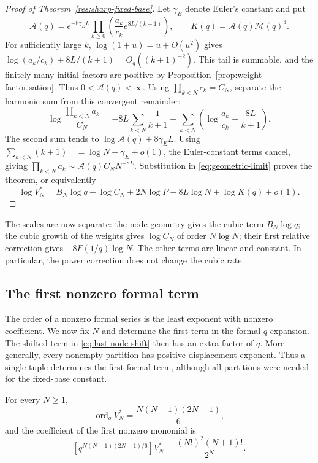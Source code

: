 \documentclass[11pt]{article}
\begin{document}
\begin{proof}[Proof of Theorem~\ref{res:sharp-fixed-base}]
Let $\gamma_{\!E}$ denote Euler's constant and put
\begin{equation}\label{eq:fixed-constant}
 \mathcal A(q)=e^{-8\gamma_{\!E}L}
 \prod_{k\ge0}\left(\frac{a_k}{c_k}e^{8L/(k+1)}\right),
 \qquad K(q)=\mathcal A(q)\mathcal M(q)^3.
\end{equation}
For sufficiently large $k$, $\log(1+u)=u+O(u^2)$ gives
$\log(a_k/c_k)+8L/(k+1)=O_q((k+1)^{-2})$.
This tail is summable, and the finitely many initial factors are
positive by Proposition~\ref{prop:weight-factorisation}. Thus
$0<\mathcal A(q)<\infty$.
Using $\prod_{k<N}c_k=C_N$, separate the harmonic sum from this
convergent remainder:
\[
 \log\frac{\prod_{k<N}a_k}{C_N}
 =-8L\sum_{k<N}\frac1{k+1}
  +\sum_{k<N}\left(\log\frac{a_k}{c_k}+\frac{8L}{k+1}\right).
\]
The second sum tends to $\log\mathcal A(q)+8\gamma_{\!E}L$.
Using $\sum_{k<N}(k+1)^{-1}=\log N+\gamma_{\!E}+o(1)$,
the Euler-constant terms cancel, giving
$\prod_{k<N}a_k\sim\mathcal A(q)C_NN^{-8L}$.
Substitution in \eqref{eq:geometric-limit} proves the theorem, or
equivalently
\[
 \log V_N^*=B_N\log q+\log C_N+2N\log P
             -8L\log N+\log K(q)+o(1).
\]
\end{proof}

The scales are now separate: the node geometry gives the cubic
term $B_N\log q$; the cubic growth of the weights gives
$\log C_N$ of order $N\log N$; their first relative correction
gives $-8F(1/q)\log N$. The other terms are linear and constant.
In particular, the power correction does not change the cubic rate.

\subsection{The first nonzero formal term}\label{sec:hankel-order}

The order of a nonzero formal series is the least exponent with
nonzero coefficient. We now fix $N$ and determine the first term
in the formal $q$-expansion. The shifted
term in \eqref{eq:last-node-shift} then has an extra factor of $q$.
More generally, every nonempty partition has positive displacement
exponent. Thus a single tuple determines the first formal term,
although all partitions were needed for the fixed-base constant.

\begin{theorem}
\label{res:zudilin-sharp-qorder}
For every $N\ge1$,
\[
 \operatorname{ord}_q V_N^*=\frac{N(N-1)(2N-1)}6,
\]
and the coefficient of the first nonzero monomial is
\[
 [q^{N(N-1)(2N-1)/6}]V_N^*
   =\frac{(N!)^2(N+1)!}{2^N}.
\]
\end{theorem}
\end{document}
